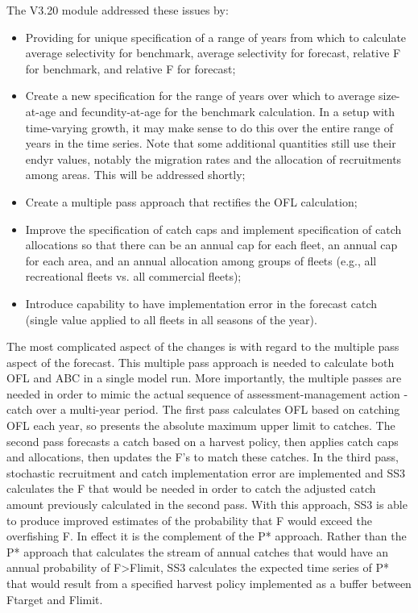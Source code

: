 The V3.20 module addressed these issues by:
\begin{itemize}
	\item Providing for unique specification of a range of years from which to calculate average selectivity for benchmark, average selectivity for forecast, relative F for benchmark, and relative F for forecast;
	\item Create a new specification for the range of years over which to average size-at-age and fecundity-at-age for the benchmark calculation. In a setup with time-varying growth, it may make sense to do this over the entire range of years in the time series. Note that some additional quantities still use their endyr values, notably the migration rates and the allocation of recruitments among areas. This will be addressed shortly;
	\item Create a multiple pass approach that rectifies the OFL calculation;
	\item Improve the specification of catch caps and implement specification of catch allocations so that there can be an annual cap for each fleet, an annual cap for each area, and an annual allocation among groups of fleets (e.g., all recreational fleets vs. all commercial fleets);
	\item Introduce capability to have implementation error in the forecast catch (single value applied to all fleets in all seasons of the year).
\end{itemize}

The most complicated aspect of the changes is with regard to the multiple pass aspect of the forecast.  This multiple pass approach is needed to calculate both OFL and ABC in a single model run. More importantly, the multiple passes are needed in order to mimic the actual sequence of assessment-management action - catch over a multi-year period. The first pass calculates OFL based on catching OFL each year, so presents the absolute maximum upper limit to catches. The second pass forecasts a catch based on a harvest policy, then applies catch caps and allocations, then updates the F's to match these catches. In the third pass, stochastic recruitment and catch implementation error are implemented and SS3 calculates the F that would be needed in order to catch the adjusted catch amount previously calculated in the second pass. With this approach, SS3 is able to produce improved estimates of the probability that F would exceed the overfishing F. In effect it is the complement of the P* approach. Rather than the P* approach that calculates the stream of annual catches that would have an annual probability of F>Flimit, SS3 calculates the expected time series of P* that would result from a specified harvest policy implemented as a buffer between Ftarget and Flimit.

